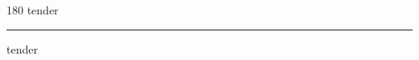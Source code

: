 
\begin{frame}
\begin{center}
\begin{turn}{180}
{\fontsize{2.5cm}{1em}\selectfont tender}
\end{turn}
\vspace{1em}\par  
\hrule
\vspace{1em}\par  
{\fontsize{2.5cm}{1em}\selectfont tender}
\end{center}
\end{frame}
